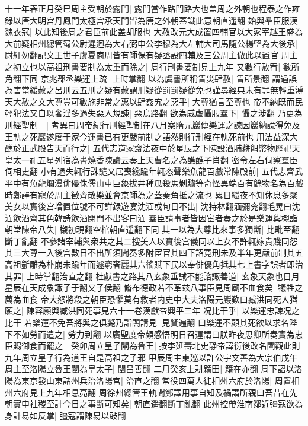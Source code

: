 十一年春正月癸巳周主受朝於露門|{
	露門當作路門路大也盖周之外朝也程泰之作雍錄以唐大明宫丹鳳門太極宫承天門皆為唐之外朝蓋識此意朝直遥翻}
始與羣臣服漢魏衣冠|{
	以此知後周之君臣前此盖胡服也}
大赦改元大成置四輔官以大冢宰越王盛為大前疑相州總管蜀公尉遲迴為大右弼申公李穆為大左輔大司馬隨公楊堅為大後承|{
	尉紆勿翻記文王世子虞夏商周皆有師保有疑丞設四輔及三公周主倣此以置官}
周主之初立也以高祖刑書要制為太重而除之|{
	周行刑書要制見上九年}
又數行赦宥|{
	數所角翻下同}
京兆郡丞樂運上疏|{
	上時掌翻}
以為虞書所稱眚災肆赦|{
	眚所景翻}
謂過誤為害當緩赦之呂刑云五刑之疑有赦謂刑疑從罰罰疑從免也謹尋經典未有罪無輕重溥天大赦之文大尊豈可數施非常之惠以肆姦宄之惡乎|{
	大尊猶言至尊也}
帝不納既而民輕犯法又自以奢淫多過失惡人規諫|{
	惡烏路翻}
欲為威虐懾服羣下|{
	懾之涉翻}
乃更為刑經聖制　|{
	考異曰周帝紀行刑經聖制在八月案隋元巖傳樂運之諫因巖納說得免及王軌之死巖遂廢于家今運書已有更嚴前制之語然則行刑經在軌死前也}
用法益深大醮於正武殿告天而行之|{
	五代志道家齋法夜中於星辰之下陳設酒脯䴵餌幣物歷祀天皇太一祀五星列宿為書燒香陳讀云奏上天曹名之為醮醮子肖翻}
密令左右伺察羣臣|{
	伺相吏翻}
小有過失輒行誅譴又居喪纔踰年輒恣聲樂魚龍百戲常陳殿前|{
	五代志齊武平中有魚龍爛漫俳優侏儒山車巨象拔井種瓜殺馬剝驢等奇怪異端百有餘物名為百戲時鄭譯有寵於周主徵齊散樂並會京師為之蓋秦角抵之流也}
累日繼夜不知休息多聚美女以實後宫增置位號不可詳録遊宴沈湎或旬日不出|{
	沈持林翻湎彌兖翻毛晃曰沈湎飲酒齊其色韓詩飲酒閉門不出客曰湎}
羣臣請事者皆因宦者奏之於是樂運輿櫬詣朝堂陳帝八失|{
	櫬初現翻空棺朝直遥翻下同}
其一以為大尊比來事多獨斷|{
	比毗至翻斷丁亂翻}
不參諸宰輔與衆共之其二搜美人以實後宫儀同以上女不許輒嫁貴賤同怨其三大尊一入後宫數日不出所須聞奏多附宦官其四下詔寛刑未及半年更嚴前制其五高祖斵雕為朴崩未踰年而遽窮奢麗其六徭賦下民以奉俳優角抵其七上書字誤者即治其罪|{
	上時掌翻治直之翻}
杜獻書之路其八玄象垂誡不能諮諏善道|{
	玄象天象也日月星辰在天成象諏子于翻又子侯翻}
脩布德政若不革兹八事臣見周廟不血食矣|{
	犧牲之薦為血食}
帝大怒將殺之朝臣恐懼莫有救者内史中大夫洛陽元巖歎曰臧洪同死人猶願之|{
	陳容願與臧洪同死事見六十一卷漢獻帝興平三年}
况比干乎|{
	以樂運忠諫况之比干}
若樂運不免吾將與之俱斃乃詣閤請見|{
	見賢遍翻}
曰樂運不顧其死欲以求名陛下不如勞而遣之|{
	勞力到翻}
以廣聖度帝頗感悟明日召運謂曰朕昨夜思卿所奏實為忠臣賜御食而罷之　癸卯周立皇子闡為魯王|{
	按李延壽北史静帝諱衍後改名闡觀此則九年周立皇子行為道王自是高祖之子邪}
甲辰周主東廵以許公宇文善為大宗伯戊午周主至洛陽立魯王闡為皇太子|{
	闡昌善翻}
二月癸亥上耕籍田|{
	籍在亦翻}
周下詔以洛陽為東京發山東諸州兵治洛陽宫|{
	治直之翻}
常役四萬人徙相州六府於洛陽|{
	周置相州六府見上九年相息亮翻}
周徐州總管王軌聞鄭譯用事自知及禍謂所親曰吾昔在先朝實申社稷至計今日之事斷可知矣|{
	朝直遥翻斷丁亂翻}
此州控帶淮南鄰近彊寇欲為身計易如反掌|{
	彊寇謂陳易以䜴翻}

